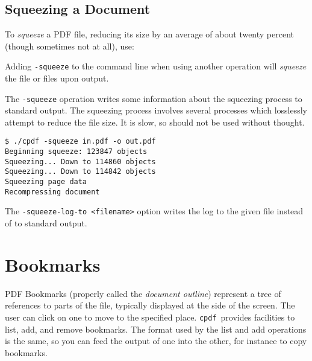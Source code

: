 \documentclass{book}
\newcommand{\cpdf}{\texttt{cpdf}}
\begin{document}
  \section{Squeezing a Document}
  To \textit{squeeze} a PDF file, reducing its size by an average of about twenty percent (though sometimes not at all), use:

\noindent{}

  \noindent Adding \texttt{-squeeze} to the command line when using another operation will \textit{squeeze} the file or files upon output.
  
  The \texttt{-squeeze} operation writes some information about the squeezing process to standard output. The squeezing process involves several processes which losslessly attempt to reduce the file size. It is slow, so should not be used without thought.

\begin{verbatim}
$ ./cpdf -squeeze in.pdf -o out.pdf
Beginning squeeze: 123847 objects
Squeezing... Down to 114860 objects
Squeezing... Down to 114842 objects
Squeezing page data
Recompressing document\end{verbatim}

The \texttt{-squeeze-log-to <filename>} option writes the log to the given file instead of to standard output.



\chapter{Bookmarks}
\noindent{}

  PDF Bookmarks (properly called the \textit{document outline}) represent a tree
of references to parts of the file, typically displayed at the side of the
screen. The user can click on one to move to the specified place. \cpdf\ provides
facilities to list, add, and remove bookmarks. The format used by the list and
add operations is the same, so you can feed the output of one into the other,
for instance to copy bookmarks.
\end{document}
